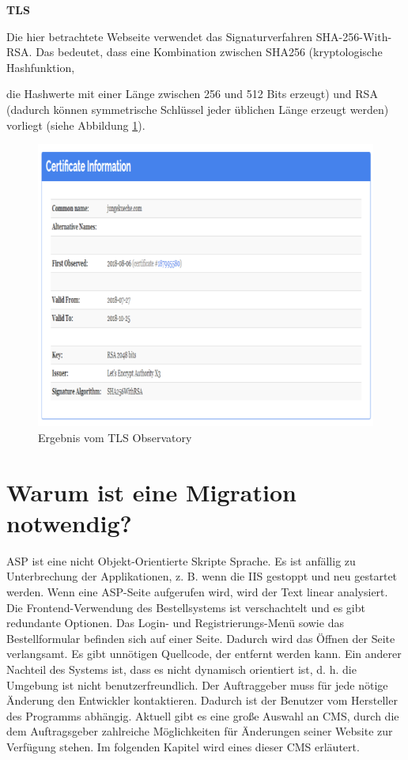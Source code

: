 \textbf{TLS}

Die hier betrachtete Webseite verwendet das Signaturverfahren SHA-256-With-RSA. Das bedeutet, dass eine Kombination zwischen SHA256 (kryptologische Hashfunktion,

die Hashwerte mit einer Länge zwischen 256 und 512 Bits erzeugt) und \ac{RSA} (dadurch können symmetrische Schlüssel jeder üblichen Länge erzeugt werden) vorliegt (siehe Abbildung \ref{fig: TSL Observatory: Ergebnis}).

\begin{figure}[h]
	\centering
	\includegraphics[width=0.6\linewidth]{Graphics/obser2.png}
	\caption[Egebniss TSL Observatory]{Ergebnis vom TLS Observatory}
	\label{fig: TSL Observatory: Ergebnis}
\end{figure}

\section{Warum ist eine Migration notwendig?}

ASP ist eine nicht Objekt-Orientierte Skripte Sprache. Es ist anfällig zu Unterbrechung der Applikationen, z. B. wenn die \ac{IIS} gestoppt und neu gestartet werden. Wenn eine ASP-Seite aufgerufen wird, wird der Text linear analysiert. Die Frontend-Verwendung des Bestellsystems ist verschachtelt und es gibt redundante Optionen. Das Login- und Registrierungs-Menü sowie das Bestellformular befinden sich auf einer Seite. Dadurch wird das Öffnen der Seite verlangsamt. Es gibt unnötigen Quellcode, der entfernt werden kann. Ein anderer Nachteil des Systems ist, dass es nicht dynamisch orientiert ist, d. h. die Umgebung ist nicht benutzerfreundlich. Der Auftraggeber muss für jede nötige Änderung den Entwickler kontaktieren. Dadurch ist der Benutzer vom Hersteller des Programms abhängig. Aktuell gibt es eine große Auswahl an CMS, durch die dem Auftragsgeber zahlreiche Möglichkeiten für Änderungen seiner Website zur Verfügung stehen. Im folgenden Kapitel wird eines dieser CMS erläutert.




